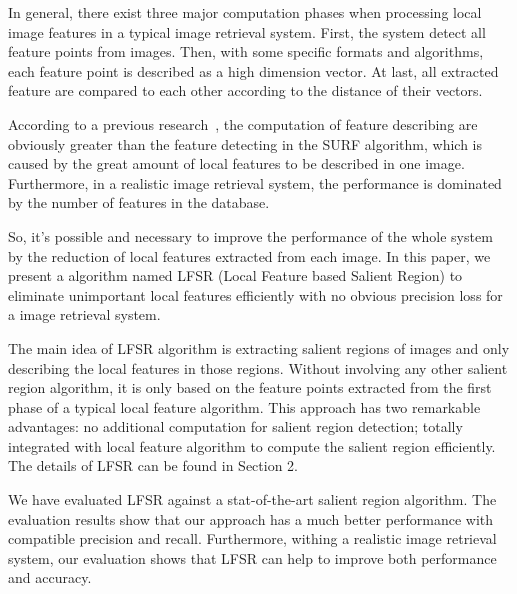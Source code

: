 In general, there exist three major computation phases when processing local image features in a typical image retrieval system. First, the system detect all feature points from images. Then, with some specific formats and algorithms, each feature point is described as a high dimension vector. At last, all extracted feature are compared to each other according to the distance of their vectors.

According to a previous research~\cite{Fang2011ispass}, the computation of feature describing are obviously greater than the feature detecting in the SURF algorithm, which is caused by the great amount of local features to be described in one image. Furthermore, in a realistic image retrieval system, the performance is dominated by the number of features in the database.

So, it's possible and necessary to improve the performance of the whole system by the reduction of local features extracted from each image. In this paper, we present a algorithm named LFSR (Local Feature based Salient Region) to eliminate unimportant local features efficiently with no obvious precision loss for a image retrieval system.

The main idea of LFSR algorithm is extracting salient regions of images and only describing the local features in those regions. Without involving any other salient region algorithm, it is only based on the feature points extracted from the first phase of a typical local feature algorithm. This approach has two remarkable advantages: no additional computation for salient region detection; totally integrated with local feature algorithm to compute the salient region efficiently. The details of LFSR can be found in Section 2. 

We have evaluated LFSR against a stat-of-the-art salient region algorithm. The evaluation results show that our approach has a much better performance with compatible precision and recall. Furthermore, withing a realistic image retrieval system, our evaluation shows that LFSR can help to improve both performance and accuracy.